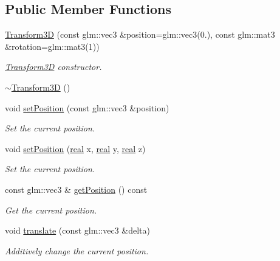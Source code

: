 \subsection*{Public Member Functions}
\begin{DoxyCompactItemize}
\item 
\mbox{\hyperlink{classr3_1_1_transform3_d_ab43888860ef5d5c124e185124cc681b5}{Transform3D}} (const glm\+::vec3 \&position=glm\+::vec3(0.), const glm\+::mat3 \&rotation=glm\+::mat3(1))
\begin{DoxyCompactList}\small\item\em \mbox{\hyperlink{classr3_1_1_transform3_d}{Transform3D}} constructor. \end{DoxyCompactList}\item 
\mbox{\hyperlink{classr3_1_1_transform3_d_acb2850307abbb9733d259dba96d5ec30}{$\sim$\+Transform3D}} ()
\item 
void \mbox{\hyperlink{classr3_1_1_transform3_d_a24bf42a0f16e38b66bd6a3ecf4f026c4}{set\+Position}} (const glm\+::vec3 \&position)
\begin{DoxyCompactList}\small\item\em Set the current position. \end{DoxyCompactList}\item 
void \mbox{\hyperlink{classr3_1_1_transform3_d_adae3a3bf01667c1c6c67d9a817d03a77}{set\+Position}} (\mbox{\hyperlink{namespacer3_ab2016b3e3f743fb735afce242f0dc1eb}{real}} x, \mbox{\hyperlink{namespacer3_ab2016b3e3f743fb735afce242f0dc1eb}{real}} y, \mbox{\hyperlink{namespacer3_ab2016b3e3f743fb735afce242f0dc1eb}{real}} z)
\begin{DoxyCompactList}\small\item\em Set the current position. \end{DoxyCompactList}\item 
const glm\+::vec3 \& \mbox{\hyperlink{classr3_1_1_transform3_d_abe9ff86c845d54cd297ff00fd21aad71}{get\+Position}} () const
\begin{DoxyCompactList}\small\item\em Get the current position. \end{DoxyCompactList}\item 
void \mbox{\hyperlink{classr3_1_1_transform3_d_a36ca89f7424b3efec3f2d5532c37f457}{translate}} (const glm\+::vec3 \&delta)
\begin{DoxyCompactList}\small\item\em Additively change the current position. \end{DoxyCompactList}\item 

\end{DoxyCompactItemize}
